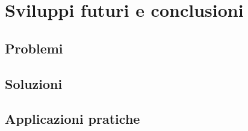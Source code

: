 \section{Sviluppi futuri e conclusioni}
\subsection{Problemi}
\subsection{Soluzioni}
\subsection{Applicazioni pratiche}

